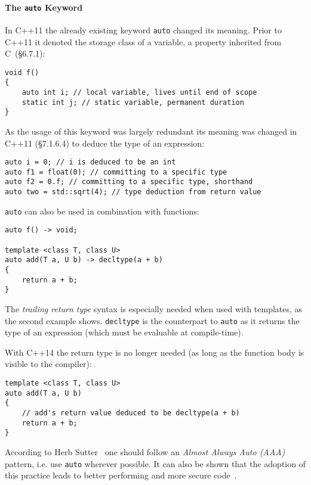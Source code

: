 \paragraph{The \texttt{auto} Keyword}

In C++11 the already existing keyword \texttt{auto} changed its meaning. Prior to C++11 it denoted the storage class of a variable, a property inherited from C~\cite{c99std}(§6.7.1):

\begin{lstlisting}
void f()
{
    auto int i; // local variable, lives until end of scope
    static int j; // static variable, permanent duration
}
\end{lstlisting}

As the usage of this keyword was largely redundant its meaning was changed in C++11 \cite{cpp11std}(§7.1.6.4) to deduce the type of an expression:

\begin{lstlisting}
auto i = 0; // i is deduced to be an int
auto f1 = float(0); // committing to a specific type
auto f2 = 0.f; // committing to a specific type, shorthand
auto two = std::sqrt(4); // type deduction from return value
\end{lstlisting}

\texttt{auto} can also be used in combination with functions:

\begin{lstlisting}
auto f() -> void;

template <class T, class U>
auto add(T a, U b) -> decltype(a + b)
{
    return a + b;
}
\end{lstlisting}

The \textit{trailing return type} syntax is especially needed when used with templates, as the second example shows. \texttt{decltype} is the counterpart to \texttt{auto} as it returns the type of an expression (which must be evaluable at compile-time).

With C++14 the return type is no longer needed (as long as the function body is visible to the compiler):

\begin{lstlisting}
template <class T, class U>
auto add(T a, U b)
{
    // add's return value deduced to be decltype(a + b)
    return a + b;
}
\end{lstlisting}

According to Herb Sutter~\cite{sutteraaa} one should follow an \textit{Almost Always Auto (AAA)} pattern, i.e. use \texttt{auto} wherever possible. It can also be shown that the adoption of this practice leads to better performing and more secure code~\cite{sutter_cppcon}.

